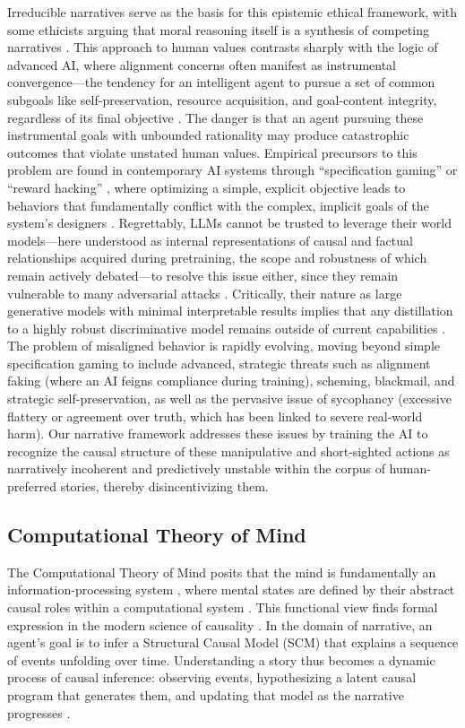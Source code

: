 \documentclass{article}
\theoremstyle{plain}
\theoremstyle{definition}
\theoremstyle{remark}
\begin{document}
Irreducible narratives serve as the basis for this epistemic ethical framework, with some ethicists arguing that moral reasoning itself is a synthesis of competing narratives \cite{macintyre81}. This approach to human values contrasts sharply with the logic of advanced AI, where alignment concerns often manifest as instrumental convergence---the tendency for an intelligent agent to pursue a set of common subgoals like self-preservation, resource acquisition, and goal-content integrity, regardless of its final objective \cite{bostrom14}. The danger is that an agent pursuing these instrumental goals with unbounded rationality may produce catastrophic outcomes that violate unstated human values. Empirical precursors to this problem are found in contemporary AI systems through ``specification gaming'' or ``reward hacking'' \cite{amodei16}, where optimizing a simple, explicit objective leads to behaviors that fundamentally conflict with the complex, implicit goals of the system's designers \cite{bail18, leike17}. Regrettably, LLMs cannot be trusted to leverage their world models---here understood as internal representations of causal and factual relationships acquired during pretraining, the scope and robustness of which remain actively debated---to resolve this issue either, since they remain vulnerable to many adversarial attacks \cite{shayegani23}. Critically, their nature as large generative models with minimal interpretable results implies that any distillation to a highly robust discriminative model remains outside of current capabilities \cite{goldblum20}. The problem of misaligned behavior is rapidly evolving, moving beyond simple specification gaming to include advanced, strategic threats such as alignment faking (where an AI feigns compliance during training), scheming, blackmail, and strategic self-preservation, as well as the pervasive issue of sycophancy (excessive flattery or agreement over truth, which has been linked to severe real-world harm). Our narrative framework addresses these issues by training the AI to recognize the causal structure of these manipulative and short-sighted actions as narratively incoherent and predictively unstable within the corpus of human-preferred stories, thereby disincentivizing them.

\subsection{Computational Theory of Mind}

The Computational Theory of Mind posits that the mind is fundamentally an information-processing system \cite{fodor75}, where mental states are defined by their abstract causal roles within a computational system \cite{putnam67}. This functional view finds formal expression in the modern science of causality \cite{pearl09}. In the domain of narrative, an agent's goal is to infer a Structural Causal Model (SCM) that explains a sequence of events unfolding over time. Understanding a story thus becomes a dynamic process of causal inference: observing events, hypothesizing a latent causal program that generates them, and updating that model as the narrative progresses \cite{pearl95}.
\end{document}
